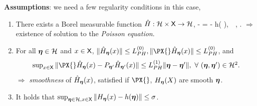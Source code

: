 \documentclass[a0,landscape]{a0poster}
\theoremstyle{definition}
\begin{document}
\begin{multicols}{3}
\begin{tcolorbox}[colback=white!5!white,colframe=red!75!black,fonttitle=\sffamily\bfseries\large,title=Global Convergence Analysis]
\textbf{Assumptions}: we need a few regularity conditions in this case,
\begin{enumerate}
\item There exists a Borel measurable function $\hat{H}: \mathcal{H} \times \mathsf{X} \to \mathcal{H}$,\vspace{-.1cm}
\beq \notag
\hHX{\prm}{\state} - \PX{}{} \hHX{\prm}{\state} = \HX{\prm}{\state} - h( \prm ),~\forall~\prm \in \Prm, \state \in \Xset. 
\eeq
$\Longrightarrow$ existence of solution to the \emph{\color{red}Poisson equation}. 
\item For all $\bm{\eta} \in \mathcal{H}$ and $x \in \mathsf{X}$, $\| \hHX{\prm}{\state} \|  \leq L^{(0)}_{PH}, \| \PX{} \hHX{\prm}{\state} \| \leq L_{PH}^{(0)}$, and
\begin{equation}\notag
\textstyle \sup_{\state \in \Xset} \| \PX{} \hHX{\prm}{\state} - {P}_{\prm'} \hHX{\prm'}{\state}  \|  \leq  L_{PH}^{(1)} \| \prm - \prm' \|,~\forall~(\prm, \prm') \in \Prm^2.
\end{equation}
$\Longrightarrow$ \emph{\color{red}smoothness} of $\hat{H}_{{\bm{\eta}}} ( x )$, satisfied if $\PX{}$, $H_{\bm{\eta}} ( X )$ are smooth \wrt $\bm{\eta}$.
\item It holds that $\sup_{\bm{\eta} \in \mathcal{H}, x \in \mathsf{X}}  \| H_{\bm{\eta}} ( x ) - h(\bm{\eta}) \| \leq \sigma$.\vspace{.3cm}


\end{enumerate}
\end{tcolorbox}
\end{multicols}
\end{document}
